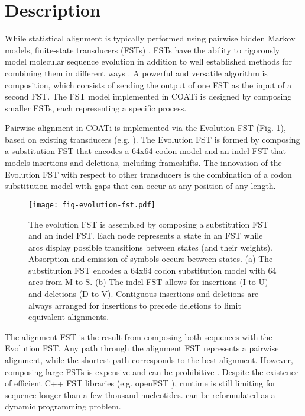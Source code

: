 \section{Description}

While statistical alignment is typically performed using pairwise hidden Markov
models, finite-state transducers (FSTs) .
FSTs  have the ability to rigorously model molecular sequence
evolution in addition to well established methods for combining them in
different ways \parencite{bradley2007transducers}.
A powerful and versatile algorithm is composition, which consists of sending the
output of one FST as the input of a second FST.
The FST model implemented in COATi is designed by composing smaller FSTs, each
representing a specific process.

Pairwise alignment in COATi is implemented via the Evolution FST (Fig.
\ref{fig:evolution-fst}), based on existing transducers (e.g.
\cite{holmes2001evolutionary}).
The Evolution FST is formed by composing a substitution FST that encodes a 64x64
codon model and an indel FST that models insertions and deletions, including
frameshifts.
The innovation of the Evolution FST with respect to other transducers is the
combination of a codon substitution model with gaps that can occur at any
position of any length.

\begin{figure}[h!]
\begin{framed}
\centering
    \texttt{[image: fig-evolution-fst.pdf]}
    \caption{The evolution FST is assembled by composing a substitution FST and
    an indel FST. Each node represents a state in an FST while arcs display
    possible transitions between states (and their weights). Absorption and
    emission of symbols occurs between states. (a) The substitution FST
    encodes a 64x64 codon substitution model with 64 arcs from M to S. (b)
    The indel FST allows for insertions (I to U) and deletions (D to V).
    Contiguous insertions and deletions are always arranged for insertions to
    precede deletions to limit equivalent alignments.}
    \label{fig:evolution-fst}
\end{framed}
\end{figure}


The alignment FST is the result from composing both sequences with the Evolution
FST.
Any path through the alignment FST represents a pairwise alignment, while the
shortest path corresponds to the best alignment.
However, composing large FSTs is expensive and can be prohibitive .
Despite the existence of efficient C++ FST libraries (e.g. openFST
\cite{allauzen2007openfst}), runtime is still limiting for sequence longer than
a few thousand nucleotides.
 can be
reformulated as a dynamic programming problem.
